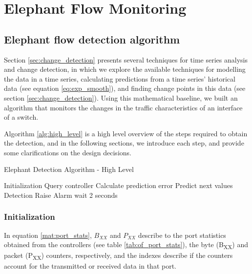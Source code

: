 \chapter{Elephant Flow Monitoring} \label{chap:me} 

\section{Elephant flow detection algorithm}

\par Section \ref{sec:change_detection} presents several techniques for time series analysis and change detection, in which we explore the available 
techniques for modelling the data in a time series, calculating predictions from a time series' historical data (see equation \ref{eq:exp_smooth}), and 
finding change points in this data (see section \ref{sec:change_detection}). Using this mathematical baseline, we built an algorithm that monitors the changes
in the traffic characteristics of an interface of a switch. 

\par Algorithm \ref{alg:high_level} is a high level overview of the steps required to obtain the detection, and in the following sections, we introduce each step,
and provide some clarifications on the design decisions.

\begin{algorithm}[H]
    \caption{Elephant Detection Algorithm - High Level} \label{alg:high_level}
    \begin{algorithmic}[1]
            \State Initialization
            \State Query controller
            \Loop
                \State Calculate prediction error
                \State Predict next values
                \State Detection
                    \State Raise Alarm
                \EndIf
                \State wait 2 seconds
            \EndLoop
        \EndProcedure 
       \end{algorithmic}
\end{algorithm}

\subsection{Initialization}

\par In equation \ref{mat:port_stats}, $B_{XX}$ and $P_{XX}$ describe to the port statistics obtained from the controllers (see table \ref{tab:of_port_stats}), the 
byte (B\textsubscript{XX}) and packet (P\textsubscript{XX}) counters, respectively, and the indexes describe if the counters account for the transmitted or
received data in that port.

